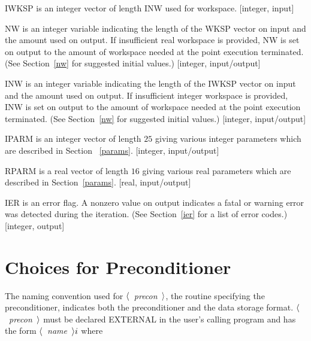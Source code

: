 \begin{list}{}{
               \leftmargin 1.00in \rightmargin 0.25in}
 \item[IWKSP \hfill]
           is an integer vector of length INW used for workspace.
           [integer, input]
 
 \item[NW \hfill]
           is an integer variable indicating the length of the
           WKSP vector on input and the amount used on output.
           If insufficient real workspace is provided, NW is
           set on output to the amount of workspace needed
           at the point execution terminated. (See Section~\ref{nw}
           for suggested initial values.) [integer, input/output]
 
 \item[INW \hfill]
           is an integer variable indicating the length of the
           IWKSP vector on input and the amount used on output.
           If insufficient integer workspace is provided, INW is
           set on output to the amount of workspace needed
           at the point execution terminated. (See Section~\ref{nw}
           for suggested initial values.) [integer, input/output]
 
 \item[IPARM \hfill]
           is an integer vector of length $25$ giving various
           integer parameters which are described in Section
           ~\ref{params}. [integer, input/output]
 
 \item[RPARM \hfill]
           is a real vector of length $16$ giving various real
           parameters which are described in Section~\ref{params}.
           [real, input/output]
 
 \item[IER \hfill]
           is an error flag.  A nonzero value on output indicates
           a fatal or warning error was detected during the
           iteration.  (See Section~\ref{ier} for a list of error 
           codes.) [integer, output]
\end{list}
 
\newpage
\section{Choices for Preconditioner}
\label{precons}
\indent
 
   The naming convention used for $\langle$~{\em precon}~$\rangle$,
the routine specifying the preconditioner, indicates both the
preconditioner and the data storage format.  $\langle$~{\em precon}~$\rangle$
must be declared EXTERNAL in the user's calling program and has
the form $\langle$~{\em name}~$\rangle i$ where
 
